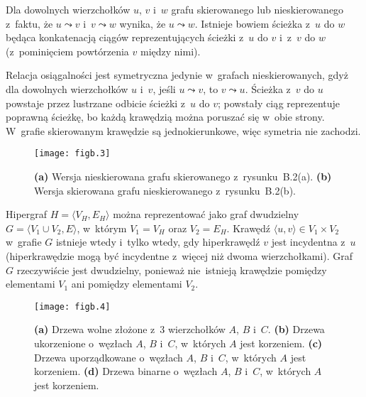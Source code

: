 Dla dowolnych wierzchołków $u$, $v$ i~$w$ grafu skierowanego lub nieskierowanego z~faktu, że $u\leadsto v$ i~$v\leadsto w$ wynika, że $u\leadsto w$. Istnieje bowiem ścieżka z~$u$ do $w$ będąca konkatenacją ciągów reprezentujących ścieżki z~$u$ do $v$ i~z~$v$ do $w$ (z~pominięciem powtórzenia $v$ między nimi).

Relacja osiągalności jest symetryczna jedynie w~grafach nieskierowanych, gdyż dla dowolnych wierzchołków $u$ i~$v$, jeśli $u\leadsto v$, to $v\leadsto u$. Ścieżka z~$v$ do $u$ powstaje przez lustrzane odbicie ścieżki z~$u$ do $v$; powstały ciąg reprezentuje poprawną ścieżkę, bo każdą krawędzią można poruszać się w~obie strony. W~grafie skierowanym krawędzie są jednokierunkowe, więc symetria nie zachodzi.

\exercise %
\begin{figure}[ht]
	\begin{center}
		\texttt{[image: figb.3]}
	\end{center}
	\caption{{\sffamily\bfseries(a)} Wersja nieskierowana grafu skierowanego z~rysunku~B.2(a). {\sffamily\bfseries(b)} Wersja skierowana grafu nieskierowanego z~rysunku~B.2(b).} \label{fig:B.4-5}
\end{figure}

\exercise %
Hipergraf $H=\langle V_H,E_H\rangle$ można reprezentować jako graf dwudzielny $G=\langle V_1\cup V_2,E\rangle$, w~którym $V_1=V_H$ oraz $V_2=E_H$. Krawędź $\langle u,v\rangle\in V_1\times V_2$ w~grafie $G$ istnieje wtedy i~tylko wtedy, gdy hiperkrawędź $v$ jest incydentna z~$u$ (hiperkrawędzie mogą być incydentne z~więcej niż dwoma wierzchołkami). Graf $G$ rzeczywiście jest dwudzielny, ponieważ nie~istnieją krawędzie pomiędzy elementami $V_1$ ani pomiędzy elementami $V_2$.


\exercise %
\begin{figure}[ht]
	\begin{center}
		\texttt{[image: figb.4]}
	\end{center}
	\caption{{\sffamily\bfseries(a)} Drzewa wolne złożone z~3 wierzchołków $A$, $B$ i~$C$. {\sffamily\bfseries(b)} Drzewa ukorzenione o~węzłach $A$, $B$ i~$C$, w~których $A$ jest korzeniem. {\sffamily\bfseries(c)} Drzewa uporządkowane o~węzłach $A$, $B$ i~$C$, w~których $A$ jest korzeniem. {\sffamily\bfseries(d)} Drzewa binarne o~węzłach $A$, $B$ i~$C$, w~których $A$ jest korzeniem.} \label{fig:B.5-1}
\end{figure}

